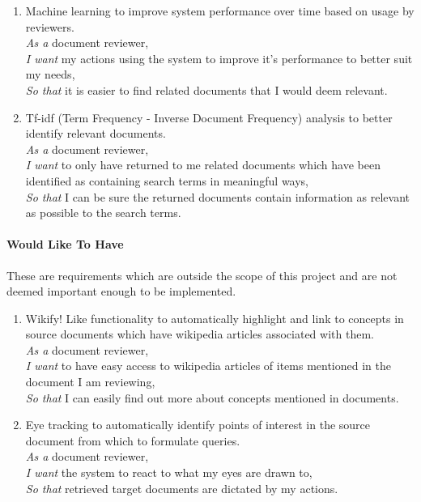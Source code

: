 \documentclass{l4proj}
\begin{document}
\begin{enumerate}[label=\textbf{C.\arabic*}]
\item Machine learning to improve system performance over time based on usage by reviewers. \\
\textit{As a} document reviewer, \\
\textit{I want} my actions using the system to improve it’s performance to better suit my needs, \\
\textit{So that} it is easier to find related documents that I would deem relevant.

\item Tf-idf (Term Frequency - Inverse Document Frequency) analysis to better identify relevant documents. \\
\textit{As a} document reviewer, \\
\textit{I want} to only have returned to me related documents which have been identified as containing search terms in meaningful ways, \\
\textit{So that} I can be sure the returned documents contain information as relevant as possible to the search terms.
\end{enumerate}

\paragraph{Would Like To Have}
These are requirements which are outside the scope of this project and are not deemed important enough to be implemented.
\begin{enumerate}[label=\textbf{W.\arabic*}]
\item Wikify! Like functionality to automatically highlight and link to concepts in source documents which have wikipedia articles associated with them. \\
\textit{As a} document reviewer, \\
\textit{I want} to have easy access to wikipedia articles of items mentioned in the document I am reviewing, \\
\textit{So that} I can easily find out more about concepts mentioned in documents.

\item Eye tracking to automatically identify points of interest in the source document from which to formulate queries. \\
\textit{As a} document reviewer, \\
\textit{I want} the system to react to what my eyes are drawn to, \\
\textit{So that} retrieved target documents are dictated by my actions.
\end{enumerate}
\end{document}
